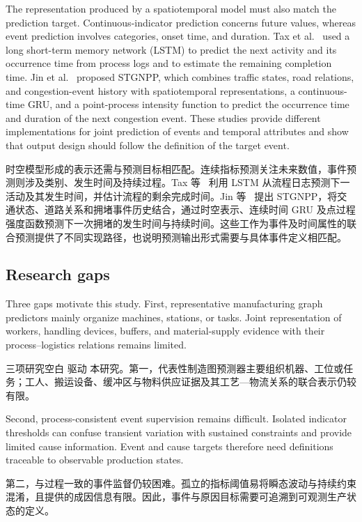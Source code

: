 \documentclass[a4paper,fleqn]{cas-dc}
\newcommand{\zhpara}[1]{%
  \par\begingroup\small\color{black!72}\noindent #1\par\endgroup}
\begin{document}
The representation produced by a spatiotemporal model must also match the prediction target. Continuous-indicator prediction concerns future values, whereas event prediction involves categories, onset time, and duration. Tax et al.~\cite{tax2017predictive} used a long short-term memory network (LSTM) to predict the next activity and its occurrence time from process logs and to estimate the remaining completion time. Jin et al.~\cite{jin2023stgnpp} proposed STGNPP, which combines traffic states, road relations, and congestion-event history with spatiotemporal representations, a continuous-time GRU, and a point-process intensity function to predict the occurrence time and duration of the next congestion event. These studies provide different implementations for joint prediction of events and temporal attributes and show that output design should follow the definition of the target event.

\zhpara{时空模型形成的表示还需与预测目标相匹配。连续指标预测关注未来数值，事件预测则涉及类别、发生时间及持续过程。Tax 等~\cite{tax2017predictive} 利用 LSTM 从流程日志预测下一活动及其发生时间，并估计流程的剩余完成时间。Jin 等~\cite{jin2023stgnpp} 提出 STGNPP，将交通状态、道路关系和拥堵事件历史结合，通过时空表示、连续时间 GRU 及点过程强度函数预测下一次拥堵的发生时间与持续时间。这些工作为事件及时间属性的联合预测提供了不同实现路径，也说明预测输出形式需要与具体事件定义相匹配。}




\subsection{Research gaps}

Three gaps motivate this study. First, representative manufacturing graph predictors mainly organize machines, stations, or tasks. Joint representation of workers, handling devices, buffers, and material-supply evidence with their process--logistics relations remains limited.

\zhpara{三项研究空白 驱动 本研究。第一，代表性制造图预测器主要组织机器、工位或任务；工人、搬运设备、缓冲区与物料供应证据及其工艺—物流关系的联合表示仍较有限。}


Second, process-consistent event supervision remains difficult. Isolated indicator thresholds can confuse transient variation with sustained constraints and provide limited cause information. Event and cause targets therefore need definitions traceable to observable production states.

\zhpara{第二，与过程一致的事件监督仍较困难。孤立的指标阈值易将瞬态波动与持续约束混淆，且提供的成因信息有限。因此，事件与原因目标需要可追溯到可观测生产状态的定义。}
\end{document}
